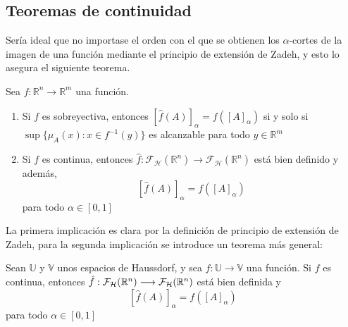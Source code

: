   \subsection{Teoremas de continuidad}
  Sería ideal que no importase el orden con el que se obtienen los $\alpha$-cortes de la imagen de una función mediante el principio de extensión de Zadeh, y esto lo asegura el siguiente teorema.
 
\newpage
  \begin{teorema}
  	\label{teorema:contfuzzy}
    Sea $f : \mathbb{R}^n \longrightarrow \mathbb{R}^m$ una función.
    \begin{enumerate}
    \item Si $f$ es sobreyectiva, entonces $[\hat{f}(A)]_\alpha = f([A]_\alpha)$ si y solo si $\sup\{\mu_A(x) : x \in f^{-1}(y)\}$ es alcanzable para todo $y \in \mathbb{R}^m$
    \item Si $f$ es continua, entonces $\hat{f} : \mathcal{F}_\mathcal{H}(\mathbb{R}^n) \longrightarrow \mathcal{F}_\mathcal{H}(\mathbb{R}^n)$ está bien definido y además,  
      $$[\hat{f}(A)]_\alpha = f([A]_\alpha)$$
      para todo $\alpha \in [0, 1]$
    \end{enumerate}
  \end{teorema}

  La primera implicación es clara por la definición de principio de extensión de Zadeh, para la segunda implicación se introduce un teorema más general:


  \begin{teorema}
    Sean $\mathbb{U}$ y $\mathbb{V}$ unos espacios de Haussdorf, y sea $f: \mathbb{U} \longrightarrow \mathbb{V}$ una función. Si $f$ es continua, entonces  $\hat{f} : \mathcal{F}_\mathcal{H}(\mathbb R^n) \longrightarrow \mathcal{F}_\mathcal{H}(\mathbb R^n)$ está bien definida y $$[\hat{f}(A)]_\alpha = f([A]_\alpha)$$
    para todo $\alpha \in [0, 1]$
  \end{teorema}

